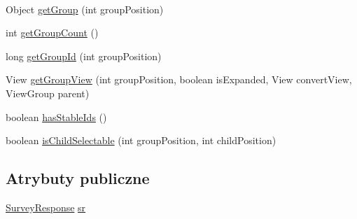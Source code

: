 \begin{DoxyCompactItemize}
$$\item 
Object \hyperlink{classcom_1_1example_1_1qrpoll_1_1_expandable_list_adapter_a3f311ecc161915f1d8a864677d36b752}{get\+Group} (int group\+Position)
\item 
int \hyperlink{classcom_1_1example_1_1qrpoll_1_1_expandable_list_adapter_ab9a9bd19ec9d4209100f8d08b56b2837}{get\+Group\+Count} ()
\item 
long \hyperlink{classcom_1_1example_1_1qrpoll_1_1_expandable_list_adapter_a9e1426065947818273f73aca8a592239}{get\+Group\+Id} (int group\+Position)
\item 
View \hyperlink{classcom_1_1example_1_1qrpoll_1_1_expandable_list_adapter_a6b8e4143490f8afe57b71a6c8ab2b0a4}{get\+Group\+View} (int group\+Position, boolean is\+Expanded, View convert\+View, View\+Group parent)
\item 
boolean \hyperlink{classcom_1_1example_1_1qrpoll_1_1_expandable_list_adapter_a57e5cc39a98135f8082d543188b916ba}{has\+Stable\+Ids} ()
\item 
boolean \hyperlink{classcom_1_1example_1_1qrpoll_1_1_expandable_list_adapter_af45bff70a6085ba623e21e42116c5275}{is\+Child\+Selectable} (int group\+Position, int child\+Position)
\end{DoxyCompactItemize}
\subsection*{Atrybuty publiczne}
\begin{DoxyCompactItemize}
\item 
\hyperlink{classcom_1_1example_1_1qrpoll_1_1_survey_response}{Survey\+Response} \hyperlink{classcom_1_1example_1_1qrpoll_1_1_expandable_list_adapter_a38af3904440bf552715d92f8c6e1375d}{sr}
\end{DoxyCompactItemize}
